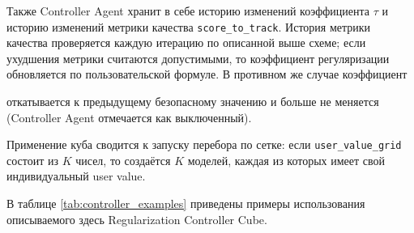 Также Controller Agent хранит в себе историю изменений коэффициента $\tau$ и историю изменений метрики качества \texttt{score\_to\_track}. История метрики качества проверяется каждую итерацию по описанной выше схеме; если ухудшения метрики считаются допустимыми, то коэффициент регуляризации обновляется по пользовательской формуле. В противном же случае коэффициент

откатывается к предыдущему безопасному значению и больше не меняется (Controller Agent отмечается как выключенный).  

Применение куба сводится к запуску перебора по сетке: если \texttt{user\_value\_grid} состоит из $K$ чисел, то создаётся $K$ моделей, каждая из которых имеет свой индивидуальный user value.  

В таблице \ref{tab:controller_examples} приведены примеры использования описываемого здесь Regularization Controller Cube.  

